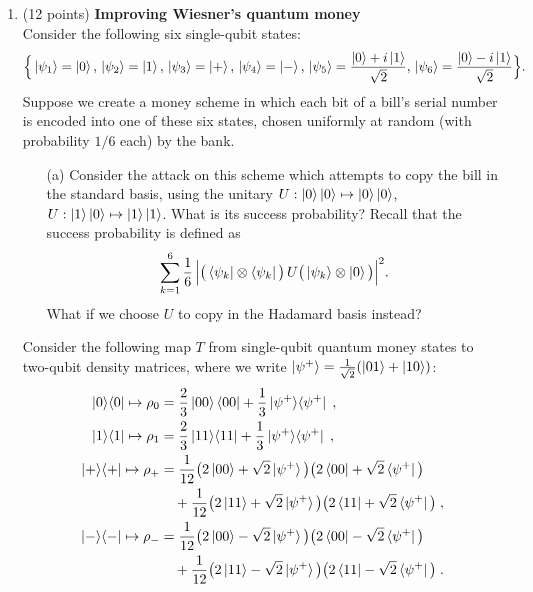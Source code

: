 \documentclass[12pt]{article}
\begin{document}
\begin{enumerate}
\item (12 points) {\bf Improving Wiesner's quantum money}\\
Consider the following six single-qubit states:
$$ \Big\{\ket{\psi_1} = \ket{0},\, \ket{\psi_2}=\ket{1},\,\ket{\psi_3}=\ket{+},\,\ket{\psi_4}=\ket{-},\,\ket{\psi_5}=\frac{\ket{0}+i\ket{1}}{\sqrt{2}},\,\ket{\psi_6}=\frac{\ket{0}-i\ket{1}}{\sqrt{2}} \Big\}.$$
Suppose we create a money scheme in which each bit of a bill's serial number is encoded into one of these six states, chosen uniformly at random (with probability $1/6$ each) by the bank. 
\begin{enumerate}
\item[(a)] Consider the attack on this scheme which attempts to copy the bill in the standard basis, using the unitary $U:\ket{0}\ket{0}\mapsto \ket{0}\ket{0}$, $U:\ket{1}\ket{0}\mapsto \ket{1}\ket{1}$. What is its success probability? Recall that the success probability is defined as 
$$\sum_{k=1}^6 \frac{1}{6}\,\Big| \big( \bra{\psi_k}\otimes \bra{\psi_k}\big)\, U \big(\ket{\psi_k} \otimes \ket{0}\big)\Big|^2 .$$
What if we choose $U$ to copy in the Hadamard basis instead? 
\end{enumerate}
Consider the following map $T$ from single-qubit quantum money states to two-qubit density matrices, where we write $\ket{\psi^+} = \frac{1}{\sqrt{2}}(\ket{01}+\ket{10})$:
\begin{align*}
\ket{0}\!\bra{0} \mapsto \rho_0 &= \frac{2}{3} \ket{00}\bra{00} + \frac{1}{3} \ket{\psi^+}\!\bra{\psi^+} \;,\\
\ket{1}\!\bra{1} \mapsto \rho_1 &= \frac{2}{3} \ket{11}\!\bra{11} + \frac{1}{3} \ket{\psi^+}\!\bra{\psi^+} \;,\\
\ket{+}\!\bra{+} \mapsto \rho_+ &= \frac{1}{12} \big( 2\ket{00}+ \sqrt{2}\ket{\psi^+} \big)\big( 2\bra{00}+ \sqrt{2}\bra{\psi^+} \big) \\
&\quad+ \frac{1}{12} \big( 2\ket{11}+ \sqrt{2}\ket{\psi^+} \big)\big( 2\bra{11}+\sqrt{2} \bra{\psi^+} \big)\;,\\
\ket{-}\!\bra{-} \mapsto \rho_- &= \frac{1}{12} \big( 2\ket{00}-\sqrt{2}\ket{\psi^+} \big)\big( 2\bra{00}- \sqrt{2}\bra{\psi^+} \big) \\
&\quad+ \frac{1}{12} \big( 2\ket{11}- \sqrt{2}\ket{\psi^+} \big)\big( 2\bra{11}-\sqrt{2} \bra{\psi^+} \big)\;.
\end{align*}

\end{enumerate}
\end{document}
